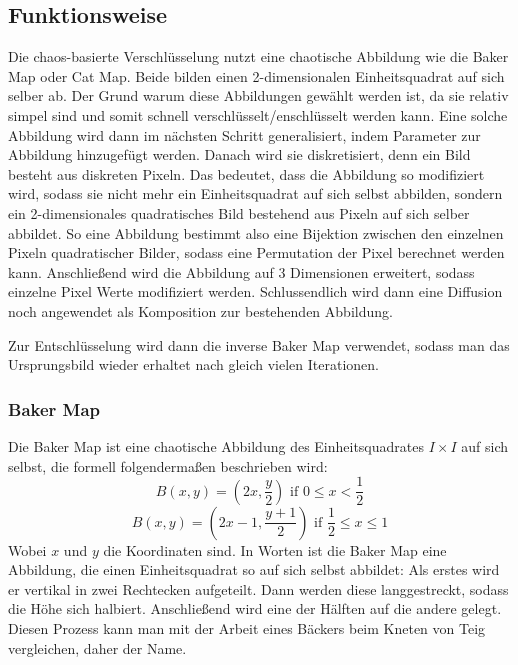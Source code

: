 \subsection{Funktionsweise}
Die chaos-basierte Verschlüsselung nutzt eine chaotische Abbildung wie die Baker Map oder Cat Map. Beide bilden
einen 2-dimensionalen Einheitsquadrat auf sich selber ab. Der Grund warum diese Abbildungen gewählt werden ist, da
sie relativ simpel sind und somit schnell verschlüsselt/enschlüsselt werden kann. 
Eine solche Abbildung wird dann im nächsten Schritt generalisiert, indem Parameter zur Abbildung hinzugefügt werden.
Danach wird sie diskretisiert, denn ein Bild besteht aus diskreten Pixeln. Das bedeutet, dass die Abbildung so
modifiziert wird, sodass sie nicht mehr ein Einheitsquadrat auf sich selbst abbilden, sondern ein 2-dimensionales quadratisches
Bild bestehend aus Pixeln auf sich selber abbildet. So eine Abbildung bestimmt also eine Bijektion zwischen den einzelnen Pixeln
quadratischer Bilder, sodass eine Permutation der Pixel berechnet werden kann. Anschließend wird die Abbildung auf 3 Dimensionen erweitert,
sodass einzelne Pixel Werte modifiziert werden. Schlussendlich wird dann eine Diffusion noch angewendet als Komposition zur bestehenden
Abbildung.
\cite{IEEEMap}

Zur Entschlüsselung wird dann die inverse Baker Map verwendet, sodass man das Ursprungsbild wieder erhaltet nach gleich vielen Iterationen.

\subsubsection{Baker Map}
Die Baker Map ist eine chaotische Abbildung des Einheitsquadrates $I \times I$ auf sich selbst, die formell folgendermaßen beschrieben wird:
$$B(x, y) = (2x, \frac{y}{2}) \text{ if }  0 \leq x < \frac{1}{2}$$
$$B(x, y) = (2x - 1, \frac{y + 1}{2}) \text{ if } \frac{1}{2} \leq x \leq 1$$
Wobei $x$ und $y$ die Koordinaten sind.
In Worten ist die Baker Map eine Abbildung, die einen Einheitsquadrat so auf sich selbst abbildet: Als erstes wird er vertikal in zwei Rechtecken
aufgeteilt. Dann werden diese langgestreckt, sodass die Höhe sich halbiert. Anschließend wird eine der Hälften auf die andere gelegt. Diesen
Prozess kann man mit der Arbeit eines Bäckers beim Kneten von Teig vergleichen, daher der Name.
\cite{IEEEMap}

